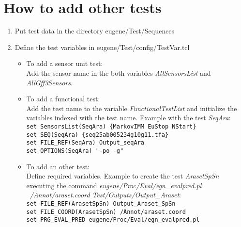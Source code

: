 \documentclass[a4paper,11pt]{article}
\begin{document}
\section{How to add other tests}
\begin{enumerate}
 \item  Put test data in the directory eugene/Test/Sequences
 \item Define the test variables in eugene/Test/config/TestVar.tcl
\begin{itemize}
 \item To add a sensor unit test:\\
Add the sensor name in the both variables \textit{AllSensorsList} and \\ 
\textit{AllGff3Sensors}.
\item To add a functional test:\\
Add the test name to the variable \textit{FunctionalTestList} and
initialize the variables indexed with the test name. Example with the test \textit{SeqAra}:\\
{\tt \small set SensorsList(SeqAra) \{MarkovIMM EuStop NStart\}\\
 set SEQ(SeqAra) \{seq25ab005234g10g11.tfa\}\\
 set FILE\_REF(SeqAra) Output\_seqAra\\
 set OPTIONS(SeqAra) "-po -g"}
\item To add an other test:\\
Define required variables. Example to create the test \textit{ArasetSpSn} executing the command 
\textit{eugene/Proc/Eval/egn\_evalpred.pl \\ /Annot/araset.coord Test/Outputs/Output\_Araset}: \\
{\tt \small set FILE\_REF(ArasetSpSn) Output\_Araset\_SpSn \\
set FILE\_COORD(ArasetSpSn) \"/Annot/araset.coord\" \\
set PRG\_EVAL\_PRED eugene/Proc/Eval/egn\_evalpred.pl }


\end{itemize}
\end{enumerate}
\end{document}
